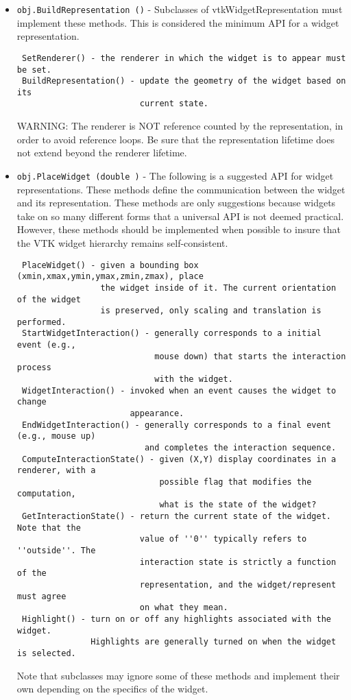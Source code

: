 \begin{itemize}
\item  \verb|obj.BuildRepresentation ()| -  Subclasses of vtkWidgetRepresentation must implement these methods. This is
 considered the minimum API for a widget representation.
 \begin{verbatim}
 SetRenderer() - the renderer in which the widget is to appear must be set.
 BuildRepresentation() - update the geometry of the widget based on its
                         current state.
 \end{verbatim}
 WARNING: The renderer is NOT reference counted by the representation,
 in order to avoid reference loops.  Be sure that the representation
 lifetime does not extend beyond the renderer lifetime.

\item  \verb|obj.PlaceWidget (double )| -  The following is a suggested API for widget representations. These methods
 define the communication between the widget and its representation. These
 methods are only suggestions because widgets take on so many different
 forms that a universal API is not deemed practical. However, these methods
 should be implemented when possible to insure that the VTK widget hierarchy
 remains self-consistent.
 \begin{verbatim}
 PlaceWidget() - given a bounding box (xmin,xmax,ymin,ymax,zmin,zmax), place 
                 the widget inside of it. The current orientation of the widget 
                 is preserved, only scaling and translation is performed.
 StartWidgetInteraction() - generally corresponds to a initial event (e.g.,
                            mouse down) that starts the interaction process
                            with the widget.
 WidgetInteraction() - invoked when an event causes the widget to change 
                       appearance.
 EndWidgetInteraction() - generally corresponds to a final event (e.g., mouse up)
                          and completes the interaction sequence.
 ComputeInteractionState() - given (X,Y) display coordinates in a renderer, with a
                             possible flag that modifies the computation,
                             what is the state of the widget?
 GetInteractionState() - return the current state of the widget. Note that the
                         value of ''0'' typically refers to ''outside''. The 
                         interaction state is strictly a function of the
                         representation, and the widget/represent must agree
                         on what they mean.
 Highlight() - turn on or off any highlights associated with the widget.
               Highlights are generally turned on when the widget is selected.
 \end{verbatim}
 Note that subclasses may ignore some of these methods and implement their own
 depending on the specifics of the widget.


\end{itemize}
